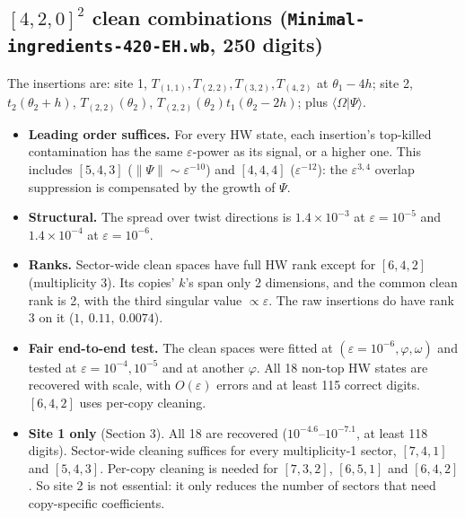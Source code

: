 \documentclass[11pt]{article}
\newcommand{\Om}{\Omega}
\newcommand{\eps}{\varepsilon}
\begin{document}
\subsection{$[4,2,0]^2$ clean combinations (\texttt{Minimal-ingredients-420-EH.wb}, 250 digits)}
The insertions are: site 1, $T_{(1,1)},T_{(2,2)},T_{(3,2)},T_{(4,2)}$ at $\theta_1-4h$; site 2, $t_2(\theta_2+h)$, $T_{(2,2)}(\theta_2)$, $T_{(2,2)}(\theta_2)t_1(\theta_2-2h)$; plus $\langle\Om|\Psi\rangle$.
\begin{itemize}
\item \textbf{Leading order suffices.} For every HW state, each insertion's top-killed contamination has the same $\eps$-power as its signal, or a higher one. This includes $[5,4,3]$ ($\|\Psi\|\sim\eps^{-10}$) and $[4,4,4]$ ($\eps^{-12}$): the $\eps^{3,4}$ overlap suppression is compensated by the growth of $\Psi$.
\item \textbf{Structural.} The spread over twist directions is $1.4\times10^{-3}$ at $\eps=10^{-5}$ and $1.4\times10^{-4}$ at $\eps=10^{-6}$.
\item \textbf{Ranks.} Sector-wide clean spaces have full HW rank except for $[6,4,2]$ (multiplicity 3). Its copies' $k$'s span only 2 dimensions, and the common clean rank is 2, with the third singular value $\propto\eps$. The raw insertions do have rank 3 on it ($1,\ 0.11,\ 0.0074$).
\item \textbf{Fair end-to-end test.} The clean spaces were fitted at $(\eps=10^{-6},\varphi,\omega)$ and tested at $\eps=10^{-4},10^{-5}$ and at another $\varphi$. All 18 non-top HW states are recovered with scale, with $O(\eps)$ errors and at least 115 correct digits. $[6,4,2]$ uses per-copy cleaning.
\item \textbf{Site 1 only} (Section 3). All 18 are recovered ($10^{-4.6}$--$10^{-7.1}$, at least 118 digits). Sector-wide cleaning suffices for every multiplicity-1 sector, $[7,4,1]$ and $[5,4,3]$. Per-copy cleaning is needed for $[7,3,2]$, $[6,5,1]$ and $[6,4,2]$. So site 2 is not essential: it only reduces the number of sectors that need copy-specific coefficients.
\end{itemize}
\end{document}
